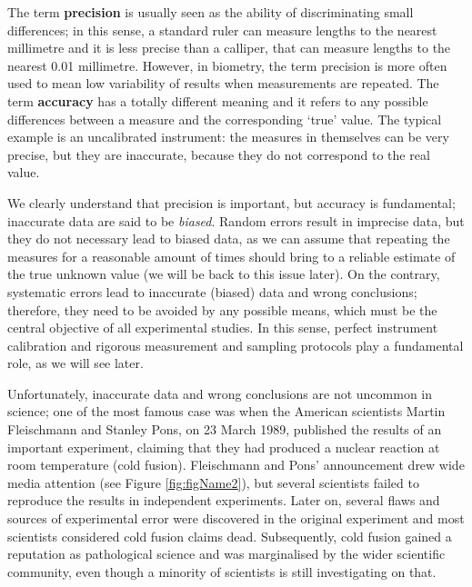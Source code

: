 \documentclass[a4paper,12pt,oneside]{book}
\begin{document}
The term \textbf{precision} is usually seen as the ability of discriminating small differences; in this sense, a standard ruler can measure lengths to the nearest millimetre and it is less precise than a calliper, that can measure lengths to the nearest 0.01 millimetre. However, in biometry, the term precision is more often used to mean low variability of results when measurements are repeated. The term \textbf{accuracy} has a totally different meaning and it refers to any possible differences between a measure and the corresponding `true' value. The typical example is an uncalibrated instrument: the measures in themselves can be very precise, but they are inaccurate, because they do not correspond to the real value.

We clearly understand that precision is important, but accuracy is fundamental; inaccurate data are said to be \emph{biased}. Random errors result in imprecise data, but they do not necessary lead to biased data, as we can assume that repeating the measures for a reasonable amount of times should bring to a reliable estimate of the true unknown value (we will be back to this issue later). On the contrary, systematic errors lead to inaccurate (biased) data and wrong conclusions; therefore, they need to be avoided by any possible means, which must be the central objective of all experimental studies. In this sense, perfect instrument calibration and rigorous measurement and sampling protocols play a fundamental role, as we will see later.

Unfortunately, inaccurate data and wrong conclusions are not uncommon in science; one of the most famous case was when the American scientists Martin Fleischmann and Stanley Pons, on 23 March 1989, published the results of an important experiment, claiming that they had produced a nuclear reaction at room temperature (cold fusion). Fleischmann and Pons' announcement drew wide media attention (see Figure \ref{fig:figName2}), but several scientists failed to reproduce the results in independent experiments. Later on, several flaws and sources of experimental error were discovered in the original experiment and most scientists considered cold fusion claims dead. Subsequently, cold fusion gained a reputation as pathological science and was marginalised by the wider scientific community, even though a minority of scientists is still investigating on that.
\end{document}
